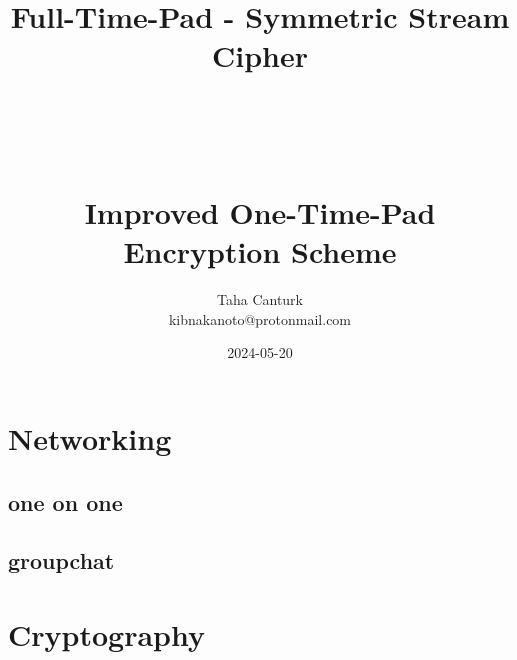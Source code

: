 \documentclass[a4paper,12pt]{article}
\title {
	\Huge Full-Time-Pad - Symmetric Stream Cipher \\
	\ \\
	\ \\
	\ \\
	\Large Improved One-Time-Pad Encryption Scheme
}
\author{Taha Canturk\\kibnakanoto@protonmail.com}
\date{2024-05-20}
\begin{document}
\maketitle

\newpage


\newpage

\tableofcontents

\newpage


\section{Networking}

\subsection{one on one}

\subsection{groupchat}

\section{Cryptography}
\end{document}
